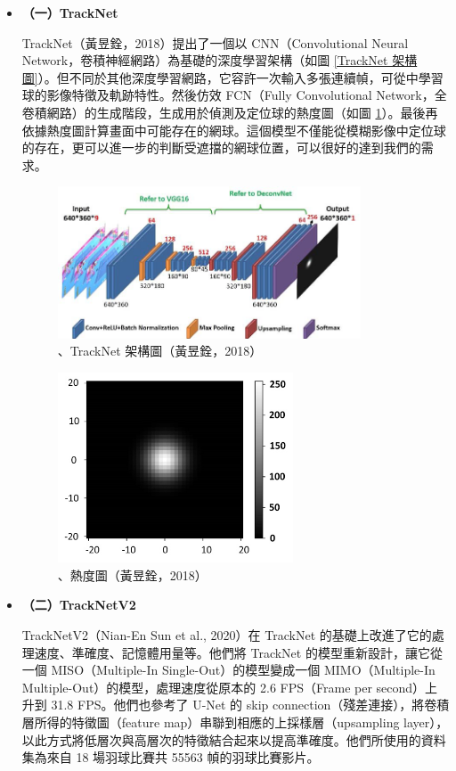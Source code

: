 \begin{itemize}
    \setlength\parindent{2em}
    \item []
    \textbf{（一）TrackNet}

    TrackNet（黃昱銓，2018）提出了一個以 CNN（Convolutional Neural Network，卷積神經網路）為基礎的深度學習架構（如圖 \ref{TrackNet 架構圖}）。但不同於其他深度學習網路，它容許一次輸入多張連續幀，可從中學習球的影像特徵及軌跡特性。然後仿效 FCN（Fully Convolutional Network，全卷積網路）的生成階段，生成用於偵測及定位球的熱度圖（如圖 \ref{熱度圖}）。最後再依據熱度圖計算畫面中可能存在的網球。這個模型不僅能從模糊影像中定位球的存在，更可以進一步的判斷受遮擋的網球位置，可以很好的達到我們的需求。
    
    \begin{figure}[H]
        \centering
        \includegraphics[width = 9cm]{picture/TrackNet 架構圖.jpg}\\
        \caption{、TrackNet 架構圖（黃昱銓，2018）}
        \label{TrackNet 架構圖}
        \vspace{1cm}
        \includegraphics[width = 7cm]{picture/熱度圖.jpg}
        \caption{、熱度圖（黃昱銓，2018）}
        \label{熱度圖}
    \end{figure}
    \item []
    \textbf{（二）TrackNetV2}

    TrackNetV2（Nian-En Sun et al., 2020）在 TrackNet 的基礎上改進了它的處理速度、準確度、記憶體用量等。他們將 TrackNet 的模型重新設計，讓它從一個 MISO（Multiple-In Single-Out）的模型變成一個 MIMO（Multiple-In Multiple-Out）的模型，處理速度從原本的 2.6 FPS（Frame per second）上升到 31.8 FPS。他們也參考了 U-Net 的 skip connection（殘差連接），將卷積層所得的特徵圖（feature map）串聯到相應的上採樣層（upsampling layer），以此方式將低層次與高層次的特徵結合起來以提高準確度。他們所使用的資料集為來自 18 場羽球比賽共 55563 幀的羽球比賽影片。


\end{itemize}
